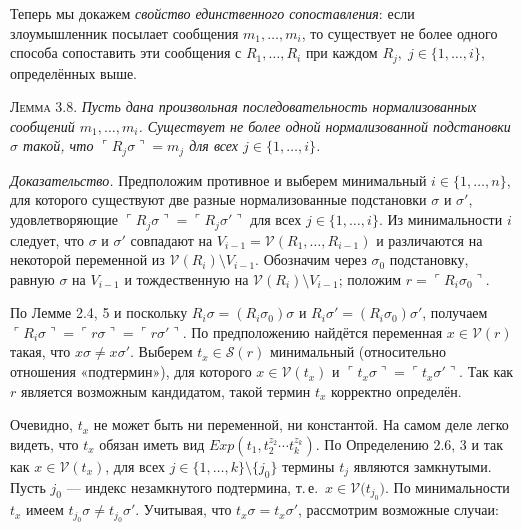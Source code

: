 Теперь мы докажем \emph{свойство единственного сопоставления}:
если злоумышленник посылает сообщения $m_1,\dots,m_i$,
то существует не более одного способа сопоставить эти сообщения
с $R_1,\dots,R_i$ при каждом $R_j,\;j\in\{1,\dots,i\}$,
определённых выше.

\textsc{Лемма 3.8.} \textit{Пусть дана произвольная последовательность
нормализованных сообщений $m_1,\dots,m_i$.
Существует не более одной нормализованной подстановки $\sigma$ такой, что
\(
  \ulcorner R_j\sigma\urcorner = m_j
\)
для всех $j\in\{1,\dots,i\}$.}

\textit{Доказательство.}
Предположим противное и выберем минимальный
$i\in\{1,\dots,n\}$, для которого существуют две разные
нормализованные подстановки $\sigma$ и $\sigma'$, удовлетворяющие
\(
  \ulcorner R_j\sigma\urcorner=\ulcorner R_j\sigma'\urcorner
\)
для всех $j\in\{1,\dots,i\}$.
Из минимальности $i$ следует, что $\sigma$ и $\sigma'$
совпадают на
\(V_{i-1}=\mathcal V(R_1,\dots,R_{i-1})\)
и различаются на некоторой переменной из
\(\mathcal V(R_i)\setminus V_{i-1}\).
Обозначим через $\sigma_0$ подстановку, равную
$\sigma$ на $V_{i-1}$ и тождественную
на \(\mathcal V(R_i)\setminus V_{i-1}\);
положим \(r=\ulcorner R_i\sigma_0\urcorner\).

По Лемме 2.4, 5 и поскольку
\(R_i\sigma=(R_i\sigma_0)\sigma\) и
\(R_i\sigma'=(R_i\sigma_0)\sigma'\),
получаем
\(
  \ulcorner R_i\sigma\urcorner
  =\ulcorner r\sigma\urcorner
  =\ulcorner r\sigma'\urcorner.
\)
По предположению найдётся переменная
\(x\in\mathcal V(r)\) такая, что \(x\sigma\ne x\sigma'\).
Выберем \(t_x\in \mathcal S(r)\) минимальный
(относительно отношения «подтермин»),
для которого \(x\in\mathcal V(t_x)\) и
\(
  \ulcorner t_x\sigma\urcorner
  =\ulcorner t_x\sigma'\urcorner.
\)
Так как $r$ является возможным кандидатом,
такой термин $t_x$ корректно определён.

Очевидно, $t_x$ не может быть ни переменной, ни константой.
На самом деле легко видеть, что
\(t_x\) обязан иметь вид
\(
  Exp(t_1,t_2^{z_2}\!\cdots t_k^{z_k}).
\)
По Определению 2.6, 3 и так как \(x\in\mathcal V(t_x)\),
для всех \(j\in\{1,\dots,k\}\setminus\{j_0\}\)
термины \(t_j\) являются замкнутыми.
Пусть \(j_0\) — индекс незамкнутого подтермина, т.\,е.\ \(x\in\mathcal V\!\bigl(t_{j_0}\bigr)\).
По минимальности \(t_x\) имеем \(t_{j_0}\sigma\neq t_{j_0}\sigma'\).
Учитывая, что \(t_x\sigma=t_x\sigma'\), рассмотрим возможные случаи:

